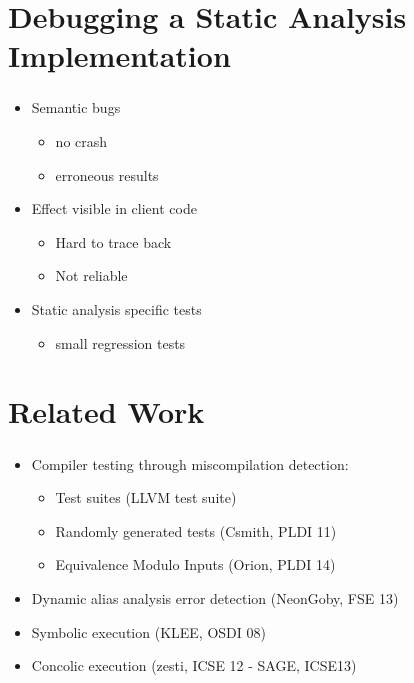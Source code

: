 \documentclass[mathserif,10pt]{beamer}
\begin{document}
\section{Debugging a Static Analysis Implementation}
\frame
{
  \frametitle{\secname}
  \begin{itemize} [<+->]
    \item Semantic bugs
    \begin{itemize}
      \item no crash
      \item erroneous results
    \end{itemize} 
    \vspace{1cm}
    \item Effect visible in client code
    \begin{itemize}
      \item Hard to trace back
      \item Not reliable
    \end{itemize} 
    \vspace{1cm}
    \item Static analysis specific tests
    \begin{itemize}
      \item small regression tests
    \end{itemize} 
  \end{itemize} 
}

\section{Related Work}
\frame
{
  \frametitle{\secname}
  \begin{itemize} [<+->]
    \item Compiler testing through miscompilation detection:
    \begin{itemize}
      \item Test suites (LLVM test suite)
      \item Randomly generated tests (Csmith, PLDI 11)
      \item Equivalence Modulo Inputs (Orion, PLDI 14)
    \end{itemize} 
    \vspace{1cm}
    \item Dynamic alias analysis error detection (NeonGoby, FSE 13)

    \vspace{1cm}
    \item Symbolic execution (KLEE, OSDI 08) 
    \item Concolic execution (zesti, ICSE 12 - SAGE, ICSE13)
  \end{itemize} 
}
\end{document}
